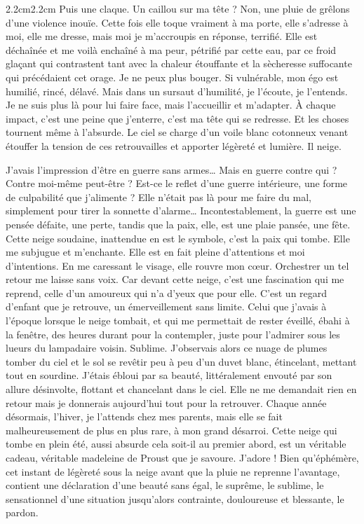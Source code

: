 \begin{adjustwidth}{2.2cm}{2.2cm}
Puis une claque. Un caillou sur ma tête ? Non, une pluie de grêlons d’une violence inouïe. Cette fois elle toque vraiment à ma porte, elle s’adresse à moi, elle me dresse, mais moi je m’accroupis en réponse, terrifié. Elle est déchaînée et me voilà enchaîné à ma peur, pétrifié par cette eau, par ce froid glaçant qui contrastent tant avec la chaleur étouffante et la sècheresse suffocante qui précédaient cet orage. Je ne peux plus bouger. Si vulnérable, mon égo est humilié, rincé, délavé. Mais dans un sursaut d’humilité, je l’écoute, je l’entends. Je ne suis plus là pour lui faire face, mais l’accueillir et m’adapter. À chaque impact, c’est une peine que j’enterre, c’est ma tête qui se redresse. Et les choses tournent même à l’absurde. Le ciel se charge d’un voile blanc cotonneux venant étouffer la tension de ces retrouvailles et apporter légèreté et lumière. Il neige.

J’avais l’impression d’être en guerre sans armes… Mais en guerre contre qui ? Contre moi-même peut-être ? Est-ce le reflet d’une guerre intérieure, une forme de culpabilité que j’alimente ? Elle n’était pas là pour me faire du mal, simplement pour tirer la sonnette d’alarme… Incontestablement, la guerre est une pensée défaite, une perte, tandis que la paix, elle, est une plaie pansée, une fête. Cette neige soudaine, inattendue en est le symbole, c’est la paix qui tombe. Elle me subjugue et m’enchante. Elle est en fait pleine d’attentions et moi d’intentions. En me caressant le visage, elle rouvre mon cœur. Orchestrer un tel retour me laisse sans voix. Car devant cette neige, c’est une fascination qui me reprend, celle d’un amoureux qui n’a d’yeux que pour elle. C’est un regard d’enfant que je retrouve, un émerveillement sans limite. Celui que j’avais à l’époque lorsque le neige tombait, et qui me permettait de rester éveillé, ébahi à la fenêtre, des heures durant pour la contempler, juste pour l’admirer sous les lueurs du lampadaire voisin. Sublime. J’observais alors ce nuage de plumes tomber du ciel et le sol se revêtir peu à peu d’un duvet blanc, étincelant, mettant tout en sourdine. J’étais ébloui par sa beauté, littéralement envouté par son allure désinvolte, flottant et chancelant dans le ciel. Elle ne me demandait rien en retour mais je donnerais aujourd’hui tout pour la retrouver. Chaque année désormais, l’hiver, je l’attends chez mes parents, mais elle se fait malheureusement de plus en plus rare, à mon grand désarroi. Cette neige qui tombe en plein été, aussi absurde cela soit-il au premier abord, est un véritable cadeau, véritable madeleine de Proust que je savoure. J’adore ! Bien qu’éphémère, cet instant de légèreté sous la neige avant que la pluie ne reprenne l’avantage, contient une déclaration d’une beauté sans égal, le suprême, le sublime, le sensationnel d’une situation jusqu’alors contrainte, douloureuse et blessante, le pardon.


\end{adjustwidth}
